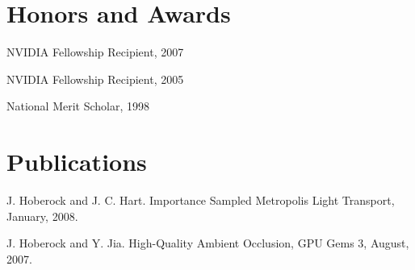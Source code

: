 \documentclass[margin,line]{res}
\newenvironment{list2}{
  \begin{list}{$\bullet$}{%
      \setlength{\itemsep}{0in}
      \setlength{\parsep}{0in} \setlength{\parskip}{0in}
      \setlength{\topsep}{0in} \setlength{\partopsep}{0in}
      \setlength{\leftmargin}{0.2in}}}{\end{list}}
\begin{document}
\begin{resume}
%
%
%

\section{\sc Honors and Awards}
NVIDIA Fellowship Recipient, 2007

\vspace*{-2.5mm}
NVIDIA Fellowship Recipient, 2005



\vspace*{-2.5mm} National Merit Scholar, 1998

\section{\sc Publications}
J. Hoberock and J. C. Hart.
Importance Sampled Metropolis Light Transport, January, 2008.

\vspace{-.275cm}
J. Hoberock and Y. Jia.
High-Quality Ambient Occlusion, GPU Gems 3, August, 2007.


\end{resume}
\end{document}
